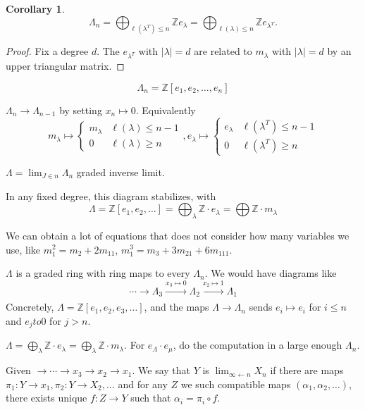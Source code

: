 \documentclass{report}
\newcommand{\Z}{\mathbb{Z}}
\newtheorem{corollary}{Corollary}[section]
\theoremstyle{definition}
\theoremstyle{remark}
\numberwithin{equation}{section}
\begin{document}
\begin{corollary}
    \[
        \Lambda_n = \bigoplus_{\ell(\lambda^T)\leq n} \Z e_{\lambda} = \bigoplus_{\ell(\lambda)\leq n} \Z e_{\lambda^T}.    
    \]
\end{corollary}
\begin{proof}
    Fix a degree $d$. The $e_{\lambda^T}$ with $|\lambda| = d$ are related to $m_\lambda$ with $|\lambda| = d$ by an upper triangular matrix.
\end{proof}

\[
    \Lambda_n = \Z[e_1, e_2, \ldots, e_n]    
\]

$\Lambda_n \to \Lambda_{n-1}$ by setting $x_n \mapsto 0$. Equivalently \[
    m_\lambda \mapsto \begin{cases}
        m_\lambda & \ell(\lambda) \leq n - 1 \\
        0 & \ell(\lambda) \geq n
    \end{cases}, e_\lambda \mapsto \begin{cases}
        e_\lambda & \ell(\lambda^T) \leq n - 1 \\
        0 & \ell(\lambda^T) \geq n
    \end{cases}
\]

$\Lambda = \lim_{J \in n} \Lambda_n$ graded inverse limit. 

In any fixed degree, this diagram stabilizes, with \[
    \Lambda = \Z[e_1, e_2, \ldots] = \bigoplus_{\lambda} \Z \cdot e_\lambda = \bigoplus \Z \cdot m_\lambda
\]


We can obtain a lot of equations that does not consider how many variables we use, like
$m_1^2 = m_2 + 2m_{11}$, $m_1^3 = m_3 + 3m_{21} + 6m_{111}$.

$\Lambda$ is a graded ring with ring maps to every $\Lambda_n$.
We would have diagrams like \[
    \cdots \rightarrow \Lambda_3 \xrightarrow[]{x_3 \mapsto 0} \Lambda_2 \xrightarrow[]{x_2 \mapsto 1} \Lambda_1    
\]
Concretely, $\Lambda = \Z[e_1, e_2, e_3, \ldots]$, and the maps $\Lambda \to \Lambda_n$ sends $e_i \mapsto e_i$ for $i \leq n$ and $e_j to 0$ for $j > n$.

$\Lambda = \bigoplus_\lambda \Z \cdot e_\lambda = \bigoplus_\lambda \Z\cdot m_\lambda$.
For $e_\Lambda \cdot e_\mu$, do the computation in a large enough $\Lambda_n$.

Given $\rightarrow \cdots \rightarrow x_3 \rightarrow x_2 \rightarrow x_1$. We say that $Y$ is $\lim_{\infty \leftarrow n} X_n$ if there are maps $\pi_1: Y \to x_1, \pi_2: Y \to X_2, \ldots$ and for any $Z$ we such compatible maps $(\alpha_1, \alpha_2, \ldots)$, there exists unique $f: Z \to Y$ such that $\alpha_i = \pi_i \circ f$.
\end{document}
